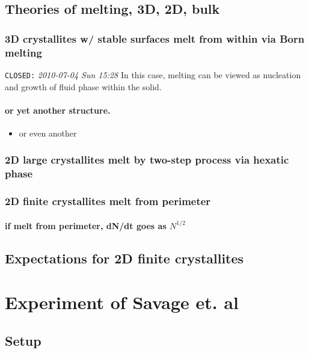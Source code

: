 \documentclass{umthesis}
\begin{document}
\subsection{Theories of melting, 3D, 2D, bulk}
\label{sec-1.1.1}
\subsubsection{3D crystallites w/ stable surfaces melt from within via Born melting}
\label{sec-1.1.1.1}

     \texttt{CLOSED:} \textit{2010-07-04 Sun 15:28}\newline
In this case, melting can be viewed as nucleation and growth of fluid phase within the solid.
\paragraph{or yet another structure.}
\label{sec-1.1.1.1.1}
\begin{itemize}

\item or even another\\
\label{sec-1.1.1.1.1.1}%
\end{itemize} %
\subsubsection{2D large crystallites melt by two-step process via hexatic phase}
\label{sec-1.1.1.2}
\subsubsection{2D finite crystallites melt from perimeter}
\label{sec-1.1.1.3}
\paragraph{if melt from perimeter, dN/dt goes as $N^{1/2}$}
\label{sec-1.1.1.3.1}
\subsection{Expectations for 2D finite crystallites}
\label{sec-1.1.2}
\section{Experiment of Savage et. al}
\label{sec-1.2}
\subsection{Setup}
\label{sec-1.2.1}
\end{document}
